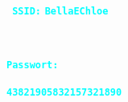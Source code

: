 \documentclass[a4paper]{scrartcl}
\begin{document}
\thispagestyle{empty}

\begin{center}
  {\textcolor{cyan}{\fontsize{50}{84}\texttt{\textbf{ SSID:}} \fontsize{50}{84}\texttt{\textbf{BellaEChloe}}}}\\[1cm]  %
  \item \textcolor{Cerulean}{}\\[20mm]
  \item \textcolor{cyan}{\fontsize{50}{84}\texttt{\textbf{Passwort:}}}\\[1cm]
  \item \textcolor{cyan}{\fontsize{50}{84}\texttt{\textbf{43821905832157321890}}}\\[2cm]
\end{center}
\end{document}
